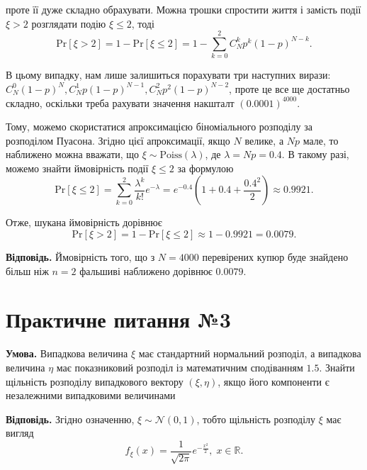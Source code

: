 \documentclass[14pt]{extarticle}
\newcommand{\<}{\langle}
\renewcommand{\>}{\rangle}
\theoremstyle{mystyle}{\newtheorem{definition}{Definition}[section]}
\theoremstyle{mystyle}{\newtheorem{proposition}[definition]{Proposition}}
\theoremstyle{mystyle}{\newtheorem{theorem}[definition]{Theorem}}
\theoremstyle{mystyle}{\newtheorem{lemma}[definition]{Lemma}}
\theoremstyle{mystyle}{\newtheorem{corollary}[definition]{Corollary}}
\theoremstyle{mystyle}{\newtheorem*{remark}{Remark}}
\theoremstyle{mystyle}{\newtheorem*{remarks}{Remarks}}
\theoremstyle{mystyle}{\newtheorem*{example}{Example}}
\theoremstyle{mystyle}{\newtheorem*{examples}{Examples}}
\theoremstyle{definition}{\newtheorem*{exercise}{Exercise}}
\theoremstyle{cstyle}{\newtheorem*{cthm}{}}
\theoremstyle{warn}
\begin{document}
проте її дуже складно обрахувати. Можна трошки спростити життя і замість події $\xi>2$ розглядати подію $\xi \leq 2$, тоді
\begin{equation}
    \text{Pr}[\xi > 2] = 1 - \text{Pr}[\xi \leq 2] = 1 - \sum_{k=0}^2 C_N^k p^k(1-p)^{N-k}.
\end{equation}

В цьому випадку, нам лише залишиться порахувати три наступних вирази: $C_N^0(1-p)^{N},C_N^1 p(1-p)^{N-1},C_N^2p^2(1-p)^{N-2}$, проте це все ще 
достатньо складно, оскільки треба рахувати значення накшталт $(0.0001)^{4000}$. 

Тому, можемо скористатися апроксимацією біноміального розподілу за розподілом Пуасона. Згідно цієї апроксимації, якщо $N$ велике, 
а $Np$ мале, то наближено можна вважати, що $\xi \sim \text{Poiss}(\lambda)$, де $\lambda = Np=0.4$. В такому разі, можемо знайти ймовірність
події $\xi \leq 2$ за формулою
\begin{equation}
    \text{Pr}[\xi \leq 2] = \sum_{k=0}^2 \frac{\lambda^k}{k!}e^{-\lambda} = e^{-0.4}\left(1 + 0.4 + \frac{0.4^2}{2}\right) \approx 0.9921.
\end{equation}

Отже, шукана ймовірність дорівнює
\begin{equation}
    \text{Pr}[\xi > 2] = 1 - \text{Pr}[\xi \leq 2] \approx 1 - 0.9921 = 0.0079.
\end{equation}

\textbf{Відповідь.} Ймовірність того, що з $N=4000$ перевірених купюр буде знайдено більш ніж $n=2$ фальшиві наближено дорівнює $0.0079$.

\pagebreak

\section{Практичне питання №3}

\textbf{Умова.} Випадкова величина $\xi$ має стандартний нормальний розподіл, а випадкова величина $\eta$ має
показниковий розподіл із математичним сподіванням $1.5$. Знайти щільність розподілу
випадкового вектору $(\xi,\eta)$, якщо його компоненти є незалежними випадковими величинами

\textbf{Відповідь.} Згідно означенню, $\xi \sim \mathcal{N}(0,1)$, тобто щільність розподілу $\xi$ має вигляд
\begin{equation}
    f_{\xi}(x) = \frac{1}{\sqrt{2\pi}}e^{-\frac{x^2}{2}}, \; x \in \mathbb{R}.
\end{equation}
\end{document}
